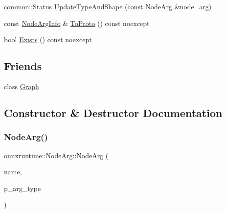 \begin{DoxyCompactItemize}
\item 
\mbox{\hyperlink{classonnxruntime_1_1common_1_1Status}{common\+::\+Status}} \mbox{\hyperlink{classonnxruntime_1_1NodeArg_aa179dde5962354ac9ae2c62ed674a737}{Update\+Type\+And\+Shape}} (const \mbox{\hyperlink{classonnxruntime_1_1NodeArg}{Node\+Arg}} \&node\+\_\+arg)
\item 
const \mbox{\hyperlink{namespaceonnxruntime_a86887111d4a0c110d744c19de4333c04}{Node\+Arg\+Info}} \& \mbox{\hyperlink{classonnxruntime_1_1NodeArg_a895f69c891315e9c304c1cc5aba31f65}{To\+Proto}} () const noexcept
\item 
bool \mbox{\hyperlink{classonnxruntime_1_1NodeArg_a99beab4822723648598119666b965ab9}{Exists}} () const noexcept
\end{DoxyCompactItemize}
\subsection*{Friends}
\begin{DoxyCompactItemize}
\item 
class \mbox{\hyperlink{classonnxruntime_1_1NodeArg_afab89afd724f1b07b1aaad6bdc61c47a}{Graph}}
\end{DoxyCompactItemize}


\subsection{Constructor \& Destructor Documentation}
\mbox{\label{classonnxruntime_1_1NodeArg_a44f519c9e037ea2f7530e6e7c547dc0a}} 
\subsubsection{\texorpdfstring{Node\+Arg()}{NodeArg()}\hspace{0.1cm}{\footnotesize\ttfamily [1/2]}}
{\footnotesize\ttfamily onnxruntime\+::\+Node\+Arg\+::\+Node\+Arg (\begin{DoxyParamCaption}\item[{const std\+::string \&}]{name,  }\item[{const O\+N\+N\+X\+\_\+\+N\+A\+M\+E\+S\+P\+A\+C\+E\+::\+Type\+Proto $\ast$}]{p\+\_\+arg\+\_\+type }\end{DoxyParamCaption})}

\mbox{\label{classonnxruntime_1_1NodeArg_a42fe9c1fd822d43315ae652c1778d198}} 
